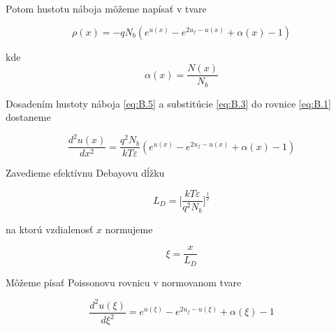 Potom hustotu náboja môžeme napísať v tvare

\begin{equation}\label{eq:B.5}
\rho(x) = -qN_b(e^{u(x)} - e^{2u_f-u(x)} + \alpha(x) -1)
\end{equation}

kde $$\alpha(x) = \frac{N(x)}{N_b}$$

Dosadením hustoty náboja \ref{eq:B.5} a substitúcie \ref{eq:B.3} do rovnice \ref{eq:B.1} dostaneme

\begin{equation}\label{eq:B.6}
\frac{d^{2}u(x)}{dx^2} = \frac{q^2N_b}{kT\varepsilon}(e^{u(x)} - e^{2u_f-u(x)} + \alpha(x) - 1)
\end{equation}

Zavedieme efektívnu Debayovu dĺžku

\begin{equation}\label{eq:B.7}
L_D = \Bigg[\frac{kT\varepsilon}{q^{2}N_b}\Bigg]^{\frac{1}{2}}
\end{equation}

na ktorú vzdialenosť $x$ normujeme

\begin{equation}\label{eq:B.8}
\xi = \frac{x}{L_D}
\end{equation}

Môžeme písať Poissonovu rovnicu v normovanom tvare

\begin{equation}\label{eq:B.9}
\frac{d^{2}u(\xi)}{d\xi^2} = e^{u(\xi)} - e^{2u_f-u(\xi)} + \alpha(\xi) -1
\end{equation}
